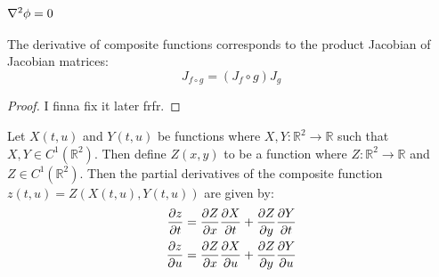 \subsubsection{$\laplacian{\phi}=0$}\label{sec:deltaphizero}
\begin{lemma}
	The derivative of composite functions corresponds to the product Jacobian of Jacobian matrices:
	$$J_{f\circ g}=(J_f\circ g)J_g$$
\end{lemma}
\begin{proof}
	I finna fix it later frfr.
\end{proof}

\begin{lemma}
Let $X(t,u)$ and $Y(t,u)$ be functions where $X,Y:\mathbb{R}^2\rightarrow\mathbb{R}$ such that $X,Y\in C^1(\mathbb{R}^2)$. Then define $Z(x,y)$ to be a function where $Z:\mathbb{R}^2\rightarrow\mathbb{R}$ and $Z\in C^1(\mathbb{R}^2)$. Then the partial derivatives of the composite function $z(t,u)=Z(X(t,u),Y(t,u))$ are given by:
\begin{align*}
	\pdv{z}{t}&=\pdv{Z}{x}\pdv{X}{t}+\pdv{Z}{y}\pdv{Y}{t}\\
	\pdv{z}{u}&=\pdv{Z}{x}\pdv{X}{u}+\pdv{Z}{y}\pdv{Y}{u}
\end{align*}
\end{lemma}
